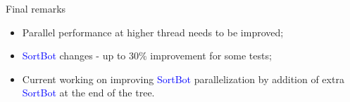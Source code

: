 \documentclass[11pt]{beamer}
\begin{document}
\begin{frame}{Final remarks}
\begin{itemize}
\item Parallel performance at higher thread needs to be improved;
\item \textcolor{blue}{SortBot} changes - up to $30\%$ improvement for some tests;
\item Current working on improving \textcolor{blue}{SortBot} parallelization by addition of extra \textcolor{blue}{SortBot} at the end of the tree.
\end{itemize}
\end{frame}
\end{document}
